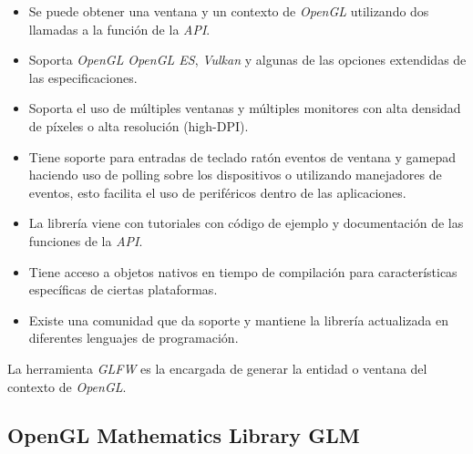 \documentclass[a4paper]{book}
\begin{document}
\begin{itemize}
  \item Se puede obtener una ventana y un contexto de \textit{OpenGL} utilizando dos llamadas a la
  función de la \textit{API}.

  \item Soporta \textit{OpenGL} \textit{OpenGL ES}, \textit{Vulkan} y algunas de las opciones extendidas de las
  especificaciones.

  \item Soporta el uso de múltiples ventanas y múltiples monitores con alta densidad de
  píxeles o alta resolución (high-DPI).

  \item Tiene soporte para entradas de teclado ratón eventos de ventana y gamepad haciendo
  uso de polling sobre los dispositivos o utilizando manejadores de eventos, esto facilita
  el uso de periféricos dentro de las aplicaciones.

  \item La librería viene con tutoriales con código de ejemplo y documentación de las
  funciones de la \textit{API}.

  \item Tiene acceso a objetos nativos en tiempo de compilación para características específicas
  de ciertas plataformas.

  \item Existe una comunidad que da soporte y mantiene la librería actualizada en diferentes
  lenguajes de programación.

\end{itemize}

La herramienta \textit{GLFW} es la encargada de generar la entidad o ventana del contexto de \textit{OpenGL}. \cite{glfw:_docs}

\subsection{OpenGL Mathematics Library GLM}
\label{subsec:GLM}
\end{document}
